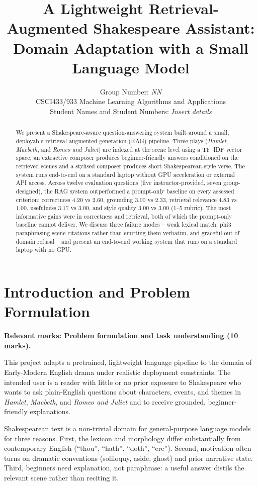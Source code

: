 \documentclass[10pt,twocolumn,a4paper]{article}
\title{
A Lightweight Retrieval-Augmented Shakespeare Assistant:\\
Domain Adaptation with a Small Language Model
}
\author{
Group Number: \emph{NN}\\
CSCI433/933 Machine Learning Algorithms and Applications\\
Student Names and Student Numbers: \emph{Insert details}
}
\begin{document}
\maketitle

\begin{abstract}
We present a Shakespeare-aware question-answering system built around a
small, deployable retrieval-augmented generation (RAG) pipeline. Three
plays (\emph{Hamlet}, \emph{Macbeth}, and \emph{Romeo and Juliet}) are
indexed at the scene level using a TF--IDF vector space; an extractive
composer produces beginner-friendly answers conditioned on the retrieved
scenes and a stylised composer produces short Shakespearean-style verse.
The system runs end-to-end on a standard laptop without GPU acceleration
or external API access. Across twelve evaluation questions (five
instructor-provided, seven group-designed), the RAG system outperformed
a prompt-only baseline on every assessed criterion: correctness
$4.20$ vs $2.60$, grounding $3.00$ vs $2.33$, retrieval relevance
$4.83$ vs $1.00$, usefulness $3.17$ vs $3.00$, and style quality
$3.00$ vs $3.00$ (1--5 rubric). The most informative gains were in
correctness and retrieval, both of which the prompt-only baseline
cannot deliver. We discuss three failure modes -- weak lexical match,
phi3 paraphrasing scene citations rather than emitting them verbatim,
and graceful out-of-domain refusal -- and present an end-to-end
working system that runs on a standard laptop with no GPU.
\end{abstract}

\section{Introduction and Problem Formulation}
\label{sec:introduction}

\textbf{Relevant marks: Problem formulation and task understanding (10 marks).}

This project adapts a pretrained, lightweight language pipeline to the
domain of Early-Modern English drama under realistic deployment
constraints. The intended user is a reader with little or no prior
exposure to Shakespeare who wants to ask plain-English questions about
characters, events, and themes in \emph{Hamlet}, \emph{Macbeth}, and
\emph{Romeo and Juliet} and to receive grounded, beginner-friendly
explanations.

Shakespearean text is a non-trivial domain for general-purpose language
models for three reasons.
First, the lexicon and morphology differ substantially from contemporary
English (``thou'', ``hath'', ``doth'', ``ere'').
Second, motivation often turns on dramatic conventions (soliloquy,
aside, ghost) and prior narrative state.
Third, beginners need explanation, not paraphrase: a useful answer
distils the relevant scene rather than reciting it.
\end{document}
